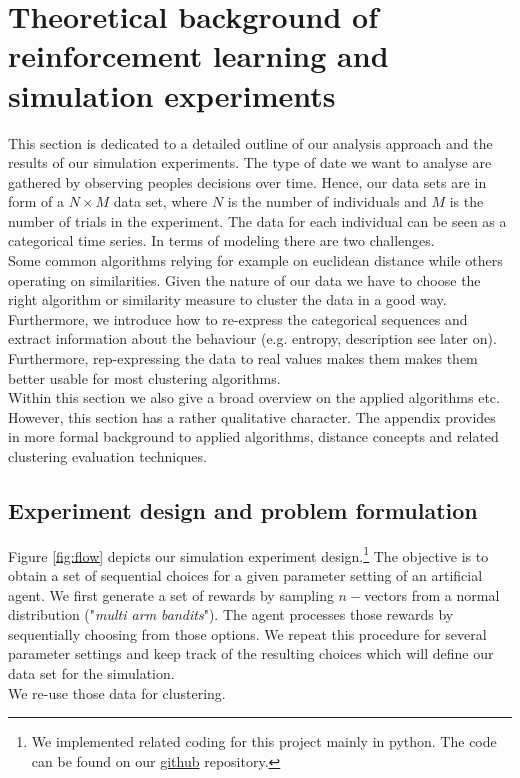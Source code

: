 \documentclass[12pt,a4paper,bibliography=totocnumbered,listof=totocnumbered]{scrartcl}
\begin{document}

\section{Theoretical background of reinforcement learning and simulation experiments}

This section is dedicated to a detailed outline of our analysis approach and the results of our simulation experiments. The type of date we want to analyse are gathered by observing peoples decisions over time. Hence, our data sets are in form of a $N \times M$ data set, where $N$ is the number of individuals and $M$ is the number of trials in the experiment. The data for each individual can be seen as a categorical time series. In terms of modeling there are two challenges.\\
Some common algorithms relying for example on euclidean distance while others operating on similarities. Given the nature of our data we have to choose the right algorithm or similarity measure to cluster the data in a good way. \\
Furthermore, we introduce how to re-express the categorical sequences and extract information about the behaviour (e.g. entropy, description see later on). Furthermore, rep-expressing the data to real values makes them makes them better usable for most clustering algorithms.\\
Within this section we also give a broad overview on the applied algorithms etc. However, this section has a rather qualitative character. The appendix provides in more formal background to applied algorithms, distance concepts and related clustering evaluation techniques. 

\subsection{Experiment design and problem formulation}

Figure \ref{fig:flow} depicts our simulation experiment design.\footnote{We implemented related coding for this project mainly in python. The code can be found on our  \href{https://github.com/FelixGSE/Master-Project}{github} repository.} The objective is to obtain a set of sequential choices for a given parameter setting of an artificial agent. We first generate a set of rewards by sampling $n-$vectors from a normal distribution ("\textit{multi arm bandits}"). The agent processes those rewards by sequentially choosing from those options. We repeat this procedure for several parameter settings and keep track of the resulting choices which will define our data set for the simulation.\\
We re-use those data for clustering. 
\end{document}
